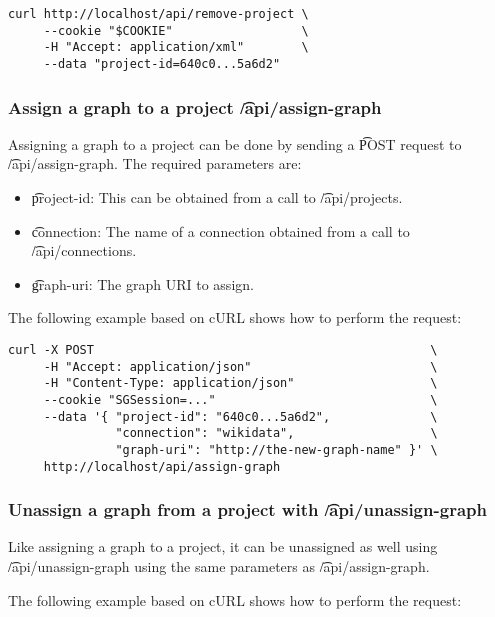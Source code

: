 \begin{lstlisting}
curl http://localhost/api/remove-project \
     --cookie "$COOKIE"                  \
     -H "Accept: application/xml"        \
     --data "project-id=640c0...5a6d2"
\end{lstlisting}

\subsubsection{Assign a graph to a project \t{/api/assign-graph}}

  Assigning a graph to a project can be done by sending a \t{POST} request
  to \t{/api/assign-graph}.  The required parameters are:

  \begin{itemize}
    \item{\t{project-id}: This can be obtained from a call to
      \t{/api/projects}.}
    \item{\t{connection}: The name of a connection obtained from
      a call to \t{/api/connections}.}
    \item{\t{graph-uri}: The graph URI to assign.}
  \end{itemize}

  The following example based on cURL shows how to perform the request:

\begin{lstlisting}
curl -X POST                                               \
     -H "Accept: application/json"                         \
     -H "Content-Type: application/json"                   \
     --cookie "SGSession=..."                              \
     --data '{ "project-id": "640c0...5a6d2",              \
               "connection": "wikidata",                   \
               "graph-uri": "http://the-new-graph-name" }' \
     http://localhost/api/assign-graph
\end{lstlisting}

\subsubsection{Unassign a graph from a project with \t{/api/unassign-graph}}

  Like assigning a graph to a project, it can be unassigned as well using
  \t{/api/unassign-graph} using the same parameters as
  \t{/api/assign-graph}.

  The following example based on cURL shows how to perform the request:

